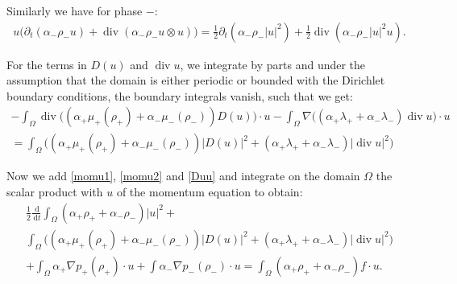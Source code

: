 \documentclass[11pt, twoside, a4paper]{article}
\theoremstyle{plain}
\theoremstyle{remark}
\numberwithin{equation}{section}
\newcommand{\dd}{\,\mathrm{d}}
\renewcommand{\div}{\operatorname{div}}
\newcommand{\dt}{\partial_t}
\newcommand{\ap}{\alpha_+}
\newcommand{\am}{\alpha_-}
\newcommand{\rp}{\rho_+}
\newcommand{\rmi}{\rho_-}
\begin{document}
Similarly we have for phase $-$:
\begin{align}
    u \Big(\dt (\am \rmi u) + \div (\am \rmi u \otimes u) \Big) = \frac{1}{2} \dt (\am \rmi |u|^2) + \frac{1}{2} \div (\am \rmi |u|^2 u).\label{momu2}
\end{align}

For the terms in $D(u)$ and $\div u$, we integrate by parts and under the assumption that the domain is either periodic or bounded with the Dirichlet boundary conditions, the boundary integrals vanish, such that we get:
\begin{align}
    - \int_\Omega \div \Big( (\ap \mu_+(\rp) + \am \mu_-(\rmi)) D(u) \Big) \cdot u - \int_\Omega \nabla \Big( (\ap \lambda_+ + \am \lambda_-) \div u \Big) \cdot u \nonumber \\
    = \int_\Omega \Big( (\ap \mu_+(\rp) + \am \mu_-(\rmi)) \lvert D(u) \rvert^2 + (\ap \lambda_+ + \am \lambda_-) \lvert \div u \rvert^2 \Big)\label{Duu}
\end{align}

Now we add \eqref{momu1}, \eqref{momu2} and \eqref{Duu} and integrate on the domain $\Omega$ the scalar product with $u$ of the momentum equation to obtain:
\begin{multline*}
    \frac{1}{2} \frac{\dd}{\dd t} \int_\Omega \left(\alpha_+\rho_{+}+\alpha_-\rho_-\right)|u|^2 +\\
    \int_\Omega \Big( (\ap \mu_+(\rp) + \am \mu_-(\rmi)) \lvert D(u) \rvert^2 + (\ap \lambda_+ + \am \lambda_-) \lvert \div u \rvert^2 \Big)\\
    + \int_\Omega \ap \nabla p_+(\rp) \cdot u + \int \am \nabla p_-(\rmi) \cdot u = \int_\Omega (\ap \rp + \am \rmi) f \cdot u.
\end{multline*}
\end{document}
